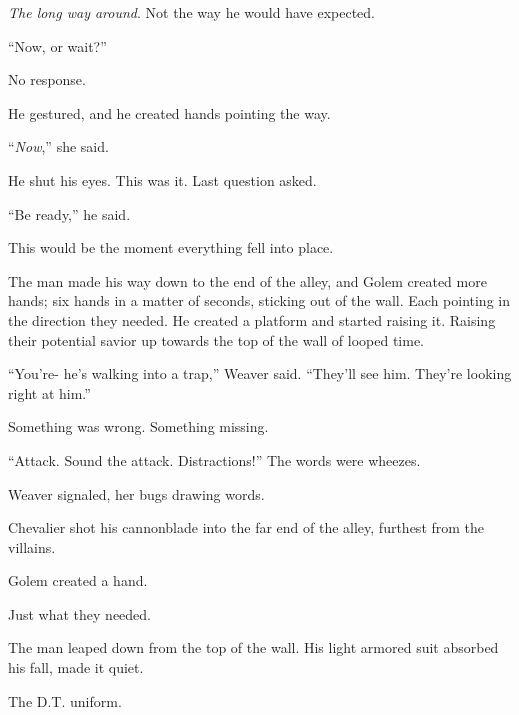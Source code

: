 \emph{The long way around}.  Not the way he would have expected.



``Now, or wait?''



No response.



He gestured, and he created hands pointing the way.



``\emph{Now},'' she said.



He shut his eyes.  This was it.  Last question asked.



``Be ready,'' he said.



This would be the moment everything fell into place.



The man made his way down to the end of the alley, and Golem created more hands;  six hands in a matter of seconds, sticking out of the wall.  Each pointing in the direction they needed.  He created a platform and started raising it.  Raising their potential savior up towards the top of the wall of looped time.



``You're- he's walking into a trap,'' Weaver said.  ``They'll see him.  They're looking right at him.''



Something was wrong.  Something missing.



``Attack.  Sound the attack.  Distractions!''  The words were wheezes.



Weaver signaled, her bugs drawing words.



Chevalier shot his cannonblade into the far end of the alley, furthest from the villains.



Golem created a hand.



Just what they needed.



The man leaped down from the top of the wall.  His light armored suit absorbed his fall, made it quiet.



The D.T. uniform.



